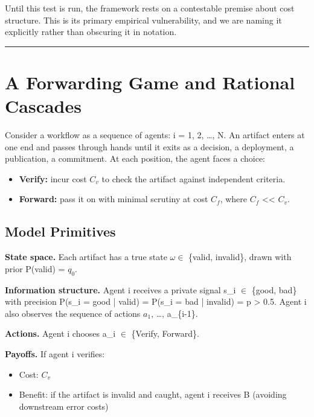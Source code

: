 \documentclass[11pt,a4paper]{article}
\providecommand{\tightlist}{\setlength{\itemsep}{0pt}\setlength{\parskip}{0pt}}
\begin{document}
Until this test is run, the framework rests on a contestable premise about cost structure. This is its primary empirical vulnerability, and we are naming it explicitly rather than obscuring it in notation.

\begin{center}\rule{0.5\linewidth}{0.5pt}\end{center}

\hypertarget{a-forwarding-game-and-rational-cascades}{%
\section{A Forwarding Game and Rational Cascades}\label{a-forwarding-game-and-rational-cascades}}

Consider a workflow as a sequence of agents: i = 1, 2, \ldots, N. An artifact enters at one end and passes through hands until it exits as a decision, a deployment, a publication, a commitment. At each position, the agent faces a choice:

\begin{itemize}
\tightlist
\item
  \textbf{Verify:} incur cost $C_v$ to check the artifact against independent criteria.
\item
  \textbf{Forward:} pass it on with minimal scrutiny at cost $C_f$, where $C_f$ \textless< $C_v$.
\end{itemize}

\hypertarget{model-primitives}{%
\subsection{ Model Primitives}\label{model-primitives}}

\textbf{State space.} Each artifact has a true state $\omega \in$ \{valid, invalid\}, drawn with prior P(valid) = $q_0$.

\textbf{Information structure.} Agent i receives a private signal s\_i $\in$ \{good, bad\} with precision P(s\_i = good | valid) = P(s\_i = bad | invalid) = p > 0.5. Agent i also observes the sequence of actions $a_1$, \ldots, a\_\{i-1\}.

\textbf{Actions.} Agent i chooses a\_i $\in$ \{Verify, Forward\}.

\textbf{Payoffs.} If agent i verifies:

\begin{itemize}
\tightlist
\item
  Cost: $C_v$
\item
  Benefit: if the artifact is invalid and caught, agent i receives B (avoiding downstream error costs)
\end{itemize}
\end{document}

